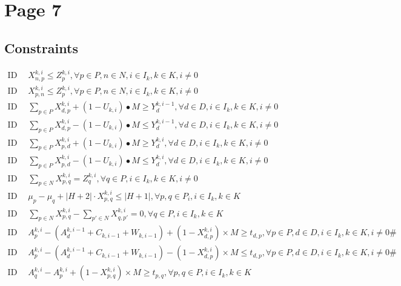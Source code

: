 \documentclass[11pt]{ctexart}
\begin{document}
\section*{Page 7}

\subsection*{Constraints}
\begin{align}
    \text{ID 26: } & X_{n,p}^{k,i} \leq Z_{p}^{k,i}, \forall p \in P, n \in N, i \in I_k, k \in K, i \neq 0 \tag{26} \\
    \text{ID 27: } & X_{p,n}^{k,i} \leq Z_{p}^{k,i}, \forall p \in P, n \in N, i \in I_k, k \in K, i \neq 0 \tag{27} \\
    \text{ID 28: } & \sum_{p \in P} X_{d,p}^{k,i} + (1 - U_{k,i}) \bullet M \geq Y_{d}^{k,i-1}, \forall d \in D, i \in I_k, k \in K, i \neq 0 \tag{28} \\
    \text{ID 29: } & \sum_{p \in P} X_{d,p}^{k,i} - (1 - U_{k,i}) \bullet M \leq Y_{d}^{k,i-1}, \forall d \in D, i \in I_k, k \in K, i \neq 0 \tag{29} \\
    \text{ID 30: } & \sum_{p \in P} X_{p,d}^{k,i} + (1 - U_{k,i}) \bullet M \geq Y_{d}^{k,i}, \forall d \in D, i \in I_k, k \in K, i \neq 0 \tag{30} \\
    \text{ID 31: } & \sum_{p \in P} X_{p,d}^{k,i} - (1 - U_{k,i}) \bullet M \leq Y_{d}^{k,i}, \forall d \in D, i \in I_k, k \in K, i \neq 0 \tag{31} \\
    \text{ID 32: } & \sum_{p \in N} X_{p,q}^{k,i} = Z_{q}^{k,i}, \forall q \in P, i \in I_k, k \in K, i \neq 0 \tag{32} \\
    \text{ID 33: } & \mu_p - \mu_q + |H + 2| \cdot X_{p,q}^{k,i} \leq |H + 1| , \forall p, q \in P_i, i \in I_k, k \in K \tag{33} \\
    \text{ID 34: } & \sum_{p \in N} X_{p,q}^{k,i} - \sum_{p' \in N} X_{q,p'}^{k,i} = 0, \forall q \in P, i \in I_k, k \in K \tag{34} \\
    \text{ID 35: } & A_p^{k,i} - (A_d^{k,i-1} + C_{k,i-1} + W_{k,i-1}) + \left(1 - X_{d,p}^{k,i}\right) \times M \geq t_{d,p}, \forall p \in P, d \in D, i \in I_k, k \in K, i \neq 0\# \tag{35} \\
    \text{ID 36: } & A_p^{k,i} - (A_d^{k,i-1} + C_{k,i-1} + W_{k,i-1}) - \left(1 - X_{d,p}^{k,i}\right) \times M \leq t_{d,p}, \forall p \in P, d \in D, i \in I_k, k \in K, i \neq 0\# \tag{36} \\
    \text{ID 37: } & A_q^{k,i} - A_p^{k,i} + \left(1 - X_{p,q}^{k,i}\right) \times M \geq t_{p,q}, \forall p, q \in P, i \in I_k, k \in K \tag{37} \\

\end{align}
\end{document}
